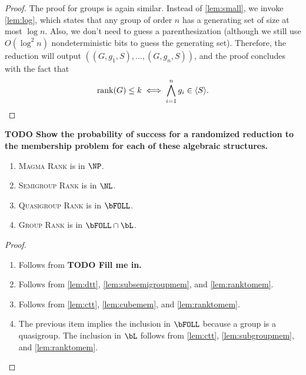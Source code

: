 \documentclass{article}
\newcommand{\todo}[1]{\textbf{TODO #1}}
\newcommand{\gen}[1]{\langle #1 \rangle}
\DeclareMathOperator{\rank}{rank}
\begin{document}
\begin{proof}
  The proof for groups is again similar.
  Instead of \autoref{lem:small}, we invoke \autoref{lem:log}, which states that any group of order $n$ has a generating set of size at most $\log n$.
  Also, we don't need to guess a parenthesization (although we still use $O(\log^2 n)$ nondeterministic bits to guess the generating set).
  Therefore, the reduction will output $((G, g_1, S), \dotsc, (G, g_n, S))$, and the proof concludes with the fact that
  \begin{equation*}
    \rank(G) \leq k \iff \bigwedge_{i = 1}^n g_i \in \gen{S}.
    \qedhere
  \end{equation*}
\end{proof}

\todo{Show the probability of success for a randomized reduction to the membership problem for each of these algebraic structures.}

\begin{theorem}\label{thm:rank}
  \mbox{}
  \begin{enumerate}
  \item \textsc{Magma Rank} is in $\NP$.
  \item \textsc{Semigroup Rank} is in $\NL$.
  \item \textsc{Quasigroup Rank} is in $\bFOLL$.
  \item \textsc{Group Rank} is in $\bFOLL \cap \bL$.
  \end{enumerate}
\end{theorem}
\begin{proof}
  \mbox{}
  \begin{enumerate}
  \item
    Follows from \todo{Fill me in.}
  \item
    Follows from \autoref{lem:dtt}, \autoref{lem:subsemigroupmem}, and \autoref{lem:ranktomem}.
  \item
    Follows from \autoref{lem:ctt}, \autoref{lem:cubemem}, and \autoref{lem:ranktomem}.
  \item
    The previous item implies the inclusion in $\bFOLL$ because a group is a quasigroup.
    The inclusion in $\bL$ follows from \autoref{lem:ctt}, \autoref{lem:subgroupmem}, and \autoref{lem:ranktomem}.
  \end{enumerate}
\end{proof}
\end{document}
